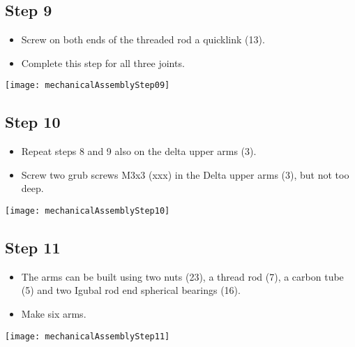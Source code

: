 \subsection*{Step 9}

\begin{minipage}[t]{0.6\textwidth}
	\begin{itemize}
		\item Screw on both ends of the threaded rod a quicklink (13).
		\item Complete this step for all three joints.
	\end{itemize}
\end{minipage}
\hfill
\begin{minipage}[t]{0.35\textwidth}
	\vspace{-\ht\strutbox}\texttt{[image: mechanicalAssemblyStep09]}
	\label{fig:MechanicalAssebmlyStep09} 
\end{minipage}

\subsection*{Step 10}

\begin{minipage}[t]{0.6\textwidth}
	\begin{itemize}
		\item Repeat steps 8 and 9 also on the delta upper arms (3).
		\item Screw two grub screws M3x3 (xxx) in the Delta upper arms (3), but not too deep.
	\end{itemize}
\end{minipage}
\hfill
\begin{minipage}[t]{0.35\textwidth}
	\vspace{-\ht\strutbox}\texttt{[image: mechanicalAssemblyStep10]}
	\label{fig:MechanicalAssebmlyStep10} 
\end{minipage}

\subsection*{Step 11}

\begin{minipage}[t]{0.6\textwidth}
	\begin{itemize}
		\item The arms can be built using two nuts (23), a thread rod (7), a carbon tube (5) and two Igubal rod end spherical bearings (16).
		\item Make six arms.
	\end{itemize}
\end{minipage}
\hfill
\begin{minipage}[t]{0.35\textwidth}
	\vspace{-\ht\strutbox}\texttt{[image: mechanicalAssemblyStep11]}
	\label{fig:MechanicalAssebmlyStep11} 
\end{minipage}

